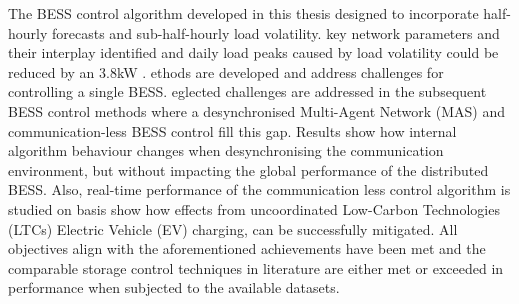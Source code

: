 The  BESS control algorithm developed in this thesis  designed to incorporate  half-hourly forecasts and sub-half-hourly load volatility.
 key network parameters and their interplay  identified and daily load peaks\hladd{,} caused by load volatility\hladd{,} could be reduced by an  3.8kW .
ethods are developed and address challenges for controlling a single BESS.
eglected challenges are addressed in the subsequent BESS control methods where a desynchronised Multi-Agent Network (MAS) and communication-less BESS control fill this gap.
Results show how internal algorithm behaviour changes when desynchronising the communication environment, but without impacting the global performance of the distributed BESS.
Also, real-time performance of the communication less control algorithm is studied on  basis  show how effects from uncoordinated Low-Carbon Technologies (LTCs)  Electric Vehicle (EV) charging, can be successfully mitigated.
All  objectives  align with the aforementioned achievements have been met  and the comparable storage control techniques in literature are either met or exceeded in performance when subjected to the available datasets.
 
 
\begin{flushright}
\end{flushright}